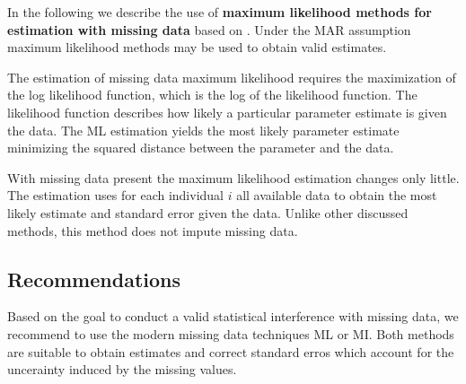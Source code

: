 In the following we describe the use of \textbf{maximum likelihood methods for estimation with missing data} based on \cite{Enders06}. 
Under the MAR assumption maximum likelihood methods may be used to obtain valid estimates. \par
The estimation of missing data maximum likelihood requires the maximization of the log likelihood function, which is the log of the likelihood function. The likelihood function describes how likely a particular parameter estimate is given the data. The ML estimation yields the most likely parameter estimate minimizing the squared distance between the parameter and the data. \par With missing data present the maximum likelihood estimation changes only little. The estimation uses for each individual $i$ all available data to obtain the most likely estimate and standard error given the data. Unlike other discussed methods, this method does not impute missing data. 

\subsection{Recommendations}
Based on the goal to conduct a valid statistical interference with missing data, we recommend to use the modern missing data techniques ML or MI. Both methods are suitable to obtain estimates and correct standard erros which account for the uncerainty induced by the missing values.
